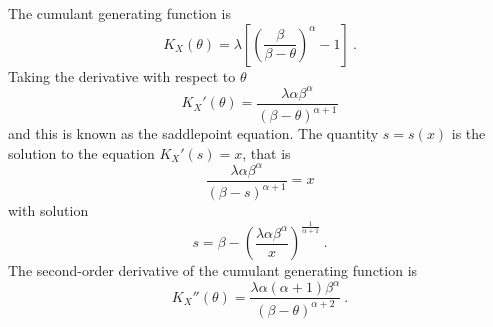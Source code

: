 The cumulant generating function is
\begin{equation}
  K_X(\theta) = \lambda
  \left[
    \left(\frac{\beta}{\beta-\theta}\right)^\alpha-1
  \right]
  \ .
  \label{eq:appendix_cgf}
\end{equation}
Taking the derivative with respect to $\theta$
\begin{equation}
  K_X'(\theta)=\frac{\lambda\alpha\beta^\alpha}{(\beta-\theta)^{\alpha+1}}
\end{equation}
and this is known as the saddlepoint equation. The quantity $s=s(x)$ is the solution to the equation $K_X'(s)=x$, that is
\begin{equation*}
  \frac{\lambda\alpha\beta^\alpha}{(\beta-s)^{\alpha+1}} = x
\end{equation*}
with solution
\begin{equation}
  s = \beta - \left(\frac{\lambda\alpha\beta^\alpha}{x}\right)^{\frac{1}{\alpha+1}}
  \ .
  \label{eq:appendix_saddlepointSolution}
\end{equation}
The second-order derivative of the cumulant generating function is
\begin{equation}
  K_X''(\theta)=\frac{\lambda\alpha(\alpha+1)\beta^\alpha}{(\beta-\theta)^{\alpha+2}} \ .
  \label{eq:appenfix_2nddiffcgf}
\end{equation}

